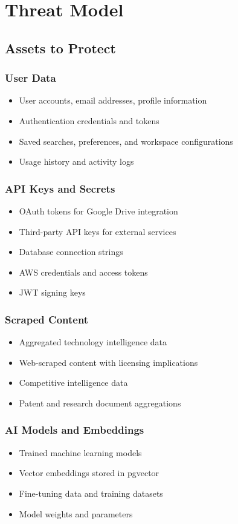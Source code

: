 \documentclass{report}
\begin{document}
\chapter{Threat Model}

\section{Assets to Protect}

\subsection{User Data}
\begin{itemize}
\item User accounts, email addresses, profile information
\item Authentication credentials and tokens
\item Saved searches, preferences, and workspace configurations
\item Usage history and activity logs
\end{itemize}

\subsection{API Keys and Secrets}
\begin{itemize}
\item OAuth tokens for Google Drive integration
\item Third-party API keys for external services
\item Database connection strings
\item AWS credentials and access tokens
\item JWT signing keys
\end{itemize}

\subsection{Scraped Content}
\begin{itemize}
\item Aggregated technology intelligence data
\item Web-scraped content with licensing implications
\item Competitive intelligence data
\item Patent and research document aggregations
\end{itemize}

\subsection{AI Models and Embeddings}
\begin{itemize}
\item Trained machine learning models
\item Vector embeddings stored in pgvector
\item Fine-tuning data and training datasets
\item Model weights and parameters
\end{itemize}
\end{document}
